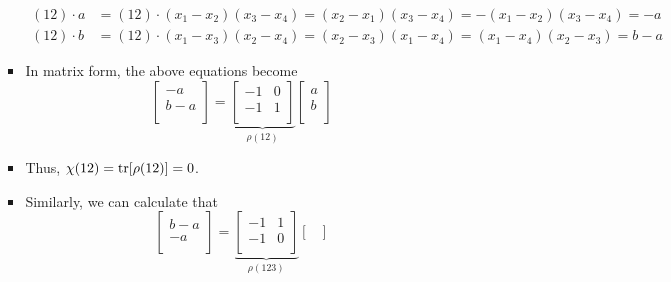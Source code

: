 \documentclass[../notes.tex]{subfiles}
\begin{document}
\begin{itemize}
\begin{itemize}
\begin{itemize}
            \begin{align*}
                (12)\cdot a &= (12)\cdot(x_1-x_2)(x_3-x_4)
                    = (x_2-x_1)(x_3-x_4)
                    = -(x_1-x_2)(x_3-x_4)
                    = -a\\
                (12)\cdot b &= (12)\cdot(x_1-x_3)(x_2-x_4)
                    = (x_2-x_3)(x_1-x_4)
                    = (x_1-x_4)(x_2-x_3)
                    = b-a
            \end{align*}
            \item In matrix form, the above equations become
            \begin{equation*}
                \begin{bmatrix}
                    -a\\
                    b-a\\
                \end{bmatrix}
                = \underbrace{
                    \begin{bmatrix}
                        -1 & 0\\
                        -1 & 1\\
                    \end{bmatrix}
                }_{\rho(12)}
                \begin{bmatrix}
                    a\\
                    b\\
                \end{bmatrix}
            \end{equation*}
            \item Thus, $\chi(12)=\tr[\rho(12)]=0$.
            \item Similarly, we can calculate that
            \begin{equation*}
                \begin{bmatrix}
                    b-a\\
                    -a\\
                \end{bmatrix}
                = \underbrace{
                    \begin{bmatrix}
                        -1 & 1\\
                        -1 & 0\\
                    \end{bmatrix}
                }_{\rho(123)}
                \begin{bmatrix}

\end{bmatrix}
\end{equation*}
\end{itemize}
\end{itemize}
\end{itemize}
\end{document}
